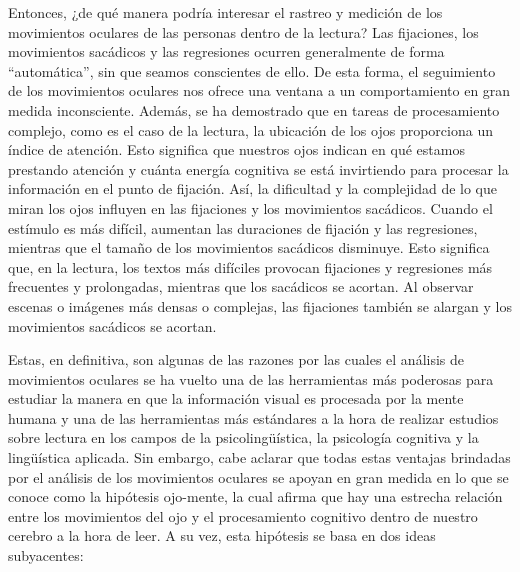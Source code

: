 Entonces, ¿de qué manera podría interesar el rastreo y medición de los movimientos oculares de las personas dentro de la lectura? Las fijaciones, los movimientos sacádicos y las regresiones ocurren generalmente de forma “automática”, sin que seamos conscientes de ello. De esta forma, el seguimiento de los movimientos oculares nos ofrece una ventana a un comportamiento en gran medida inconsciente. Además, se ha demostrado que en tareas de procesamiento complejo, como es el caso de la lectura, la ubicación de los ojos proporciona un índice de atención. \parencite{Rayner2009} Esto significa que nuestros ojos indican en qué estamos prestando atención y cuánta energía cognitiva se está invirtiendo para procesar la información en el punto de fijación. Así, la dificultad y la complejidad de lo que miran los ojos influyen en las fijaciones y los movimientos sacádicos. \parencite{CastelhanoRayner2008} Cuando el estímulo es más difícil, aumentan las duraciones de fijación y las regresiones, mientras que el tamaño de los movimientos sacádicos disminuye. Esto significa que, en la lectura, los textos más difíciles provocan fijaciones y regresiones más frecuentes y prolongadas, mientras que los sacádicos se acortan. Al observar escenas o imágenes más densas o complejas, las fijaciones también se alargan y los movimientos sacádicos se acortan.

Estas, en definitiva, son algunas de las razones por las cuales el análisis de movimientos oculares se ha vuelto una de las herramientas más poderosas para estudiar la manera en que la información visual es procesada por la mente humana y una de las herramientas más estándares a la hora de realizar estudios sobre lectura en los campos de la psicolingüística, la psicología cognitiva y la lingüística aplicada. \parencite[p. 1474]{Rayner2009} Sin embargo, cabe aclarar que todas estas ventajas brindadas por el análisis de los movimientos oculares se apoyan en gran medida en lo que se conoce como la hipótesis ojo-mente, la cual afirma que hay una estrecha relación entre los movimientos del ojo y el procesamiento cognitivo dentro de nuestro cerebro a la hora de leer. \parencite{JustCarpenter1980} A su vez, esta hipótesis se basa en dos ideas subyacentes:

